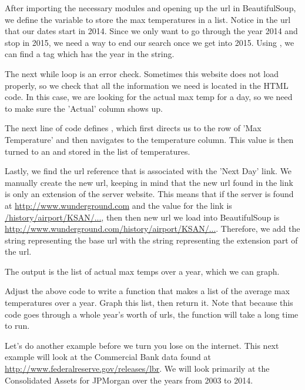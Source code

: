 After importing the necessary modules and opening up the url in BeautifulSoup, we define the variable  to store the max temperatures in a list.
Notice in the url that our dates start in 2014.
Since we only want to go through the year 2014 and stop in 2015, we need a way to end our search once we get into 2015.
Using , we can find a tag which has the year in the string.

The next while loop is an error check.
Sometimes this website does not load properly, so we check that all the information we need is located in the HTML code.
In this case, we are looking for the actual max temp for a day, so we need to make sure the 'Actual' column shows up.

The next line of code defines , which first directs us to the row of 'Max Temperature' and then navigates to the temperature column.
This value is then turned to an  and stored in the list of temperatures.

Lastly, we find the url reference that is associated with the 'Next Day' link.
We manually create the new url, keeping in mind that the new url found in the link is only an extension of the server website.
This means that if the server is found at \url{http://www.wunderground.com} and the  value for the link is \url{/history/airport/KSAN/...}, then then new url we load into BeautifulSoup is \url{http://www.wunderground.com/history/airport/KSAN/...}.
Therefore, we add the string representing the base url with the string representing the extension part of the url.

The output is the list of actual max temps over a year, which we can graph.

\begin{problem}
Adjust the above code to write a function that makes a list of the average max temperatures over a year.
Graph this list, then return it.
Note that because this code goes through a whole year's worth of urls, the function will take a long time to run.
\end{problem}

Let's do another example before we turn you lose on the internet.
This next example will look at the Commercial Bank data found at \url{http://www.federalreserve.gov/releases/lbr}.
We will look primarily at the Consolidated Assets for JPMorgan over the years from 2003 to 2014.

